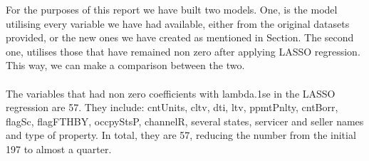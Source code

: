 For the purposes of this report we have built two models. One, is the model 
utilising every variable we have had available, either from the original 
datasets provided, or the new ones we have created as mentioned in Section. 
The second one, utilises those that have remained non zero after applying 
LASSO regression. This way, we can make a comparison between the two.
\\\\
The variables that had non zero coefficients with lambda.1se in the LASSO 
regression are 57. They include: cntUnits, cltv, dti, ltv, ppmtPnlty, 
cntBorr, flagSc, flagFTHBY, occpyStsP, channelR, several states, servicer 
and seller names and type of property. In total, they are 57, reducing the 
number from the initial 197 to almost a quarter. 



    
% 
% 
